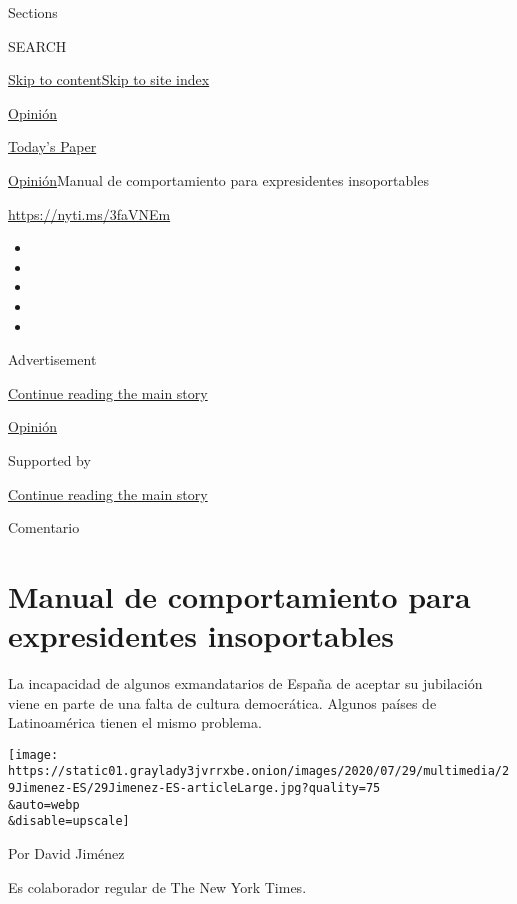 Sections

SEARCH

\protect\hyperlink{site-content}{Skip to
content}\protect\hyperlink{site-index}{Skip to site index}

\href{https://www.nytimes3xbfgragh.onion/es/section/opinion}{Opinión}

\href{https://myaccount.nytimes3xbfgragh.onion/auth/login?response_type=cookie\&client_id=vi}{}

\href{https://www.nytimes3xbfgragh.onion/section/todayspaper}{Today's
Paper}

\href{/es/section/opinion}{Opinión}\textbar{}Manual de comportamiento
para expresidentes insoportables

\url{https://nyti.ms/3faVNEm}

\begin{itemize}
\item
\item
\item
\item
\item
\end{itemize}

Advertisement

\protect\hyperlink{after-top}{Continue reading the main story}

\href{/es/section/opinion}{Opinión}

Supported by

\protect\hyperlink{after-sponsor}{Continue reading the main story}

Comentario

\hypertarget{manual-de-comportamiento-para-expresidentes-insoportables}{%
\section{Manual de comportamiento para expresidentes
insoportables}\label{manual-de-comportamiento-para-expresidentes-insoportables}}

La incapacidad de algunos exmandatarios de España de aceptar su
jubilación viene en parte de una falta de cultura democrática. Algunos
países de Latinoamérica tienen el mismo problema.

\texttt{[image: https://static01.graylady3jvrrxbe.onion/images/2020/07/29/multimedia/29Jimenez-ES/29Jimenez-ES-articleLarge.jpg?quality=75\\\&auto=webp\\\&disable=upscale]}

Por David Jiménez

Es colaborador regular de The New York Times.

